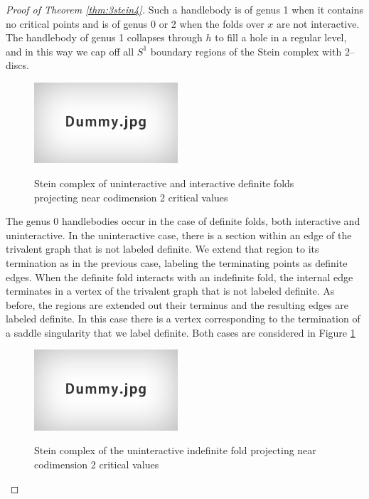 \begin{proof}[Proof of Theorem \ref{thm:3stein4}]
	Such a handlebody is of genus 1 when it contains no critical points and is of genus 0 or 2 when the folds over $x$ are not interactive.
	The handlebody of genus 1 collapses through $h$ to fill a hole in a regular level, and in this way we cap off all $S^1$ boundary regions of the Stein complex with 2--discs.

	\begin{figure}
		\centering
		\captionsetup{justification=centering}
		\caption{Stein complex of uninteractive and interactive definite folds projecting near codimension 2 critical values}
		\includegraphics[height=3cm]{figures/dummy.jpg}
		\label{fig:codim2steindef}
	\end{figure}
	
	The genus 0 handlebodies occur in the case of definite folds, both interactive and uninteractive.
	In the uninteractive case, there is a section within an edge of the trivalent graph that is not labeled definite.
	We extend that region to its termination as in the previous case, labeling the terminating points as definite edges.
	When the definite fold interacts with an indefinite fold, the internal edge terminates in a vertex of the trivalent graph that is not labeled definite.
	As before, the regions are extended out their terminus and the resulting edges are labeled definite.
	In this case there is a vertex corresponding to the termination of a saddle singularity that we label definite.
	Both cases are considered in Figure \ref{fig:codim2steindef}

	\begin{figure}
		\centering
		\captionsetup{justification=centering}
		\caption{Stein complex of the uninteractive indefinite fold projecting near codimension 2 critical values}
		\includegraphics[height=3cm]{figures/dummy.jpg}
		\label{fig:codim2steinindefun}
	\end{figure}
	

\end{proof}
